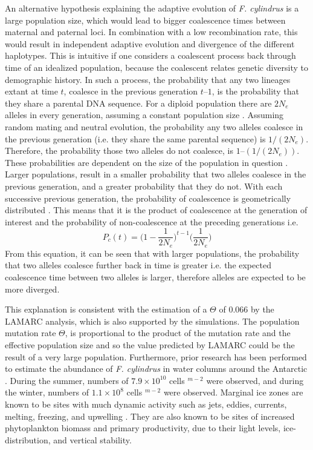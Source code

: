 An alternative hypothesis explaining the adaptive evolution of \textit{F. cylindrus} is a large population size, which would lead to bigger coalescence times between maternal and paternal loci.
In combination with a low recombination rate, this would result in independent adaptive evolution and divergence of the different haplotypes.
This is intuitive if one considers a coalescent process back through time of an idealized population, because the coalescent relates genetic diversity to demographic history.
In such a process, the probability that any two lineages extant at time $t$, coalesce in the previous generation $t – 1$, is the probability that they share a parental DNA sequence.
For a diploid population there are $2N_e$ alleles in every generation, assuming a constant population size \parencite{Hein2004}.
Assuming random mating and neutral evolution, the probability any two alleles coalesce in the previous generation (i.e. they share the same parental sequence) is $1 / (2N_e)$.
Therefore, the probability those two alleles do not coalesce, is $1 – (1/(2N_e))$.
These probabilities are dependent on the size of the population in question \parencite{Wakeley2008}.
Larger populations, result in a smaller probability that two alleles coalesce in the previous generation, and a greater probability that they do not.
With each successive previous generation, the probability of coalescence is geometrically distributed \parencite{Hein2004,Wakeley2008}.
This means that it is the product of coalescence at the generation of interest and the probability of non-coalescence at the preceding generations i.e.
\begin{equation}
P_c(t)=\bigg(1-\frac{1}{2N_e}\bigg)^{t-1}\bigg(\frac{1}{2N_e}\bigg)
\end{equation}
From this equation, it can be seen that with larger populations, the probability that two alleles coalesce further back in time is greater i.e. the expected coalescence time between two alleles is larger, therefore alleles are expected to be more diverged.

This explanation is consistent with the estimation of a $\Theta$ of 0.066 by the LAMARC \parencite{Kuhner2006a} analysis, which is also supported by the simulations.
The population mutation rate $\Theta$, is proportional to the product of the mutation rate and the effective population size and so the value predicted by LAMARC could be the result of a very large population.
Furthermore, prior research has been performed to estimate the abundance of \textit{F. cylindrus} in water columns around the Antarctic \parencite{Kang1992}.
During the summer, numbers of $7.9 \times 10^{10}$ cells $^{m-2}$ were observed, and during the winter, numbers of $1.1 \times 10^8$ cells $^{m-2}$ were observed.
Marginal ice zones are known to be sites with much dynamic activity such as jets, eddies, currents, melting, freezing, and upwelling \parencite{Kang1992}.
They are also known to be sites of increased phytoplankton biomass and primary productivity, due to their light levels, ice-distribution, and vertical stability.

